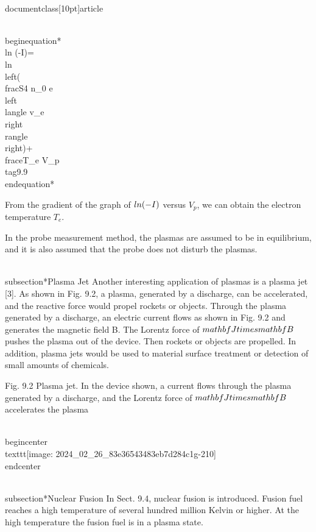 \\documentclass[10pt]{article}
\begin{document}
{{{{{\\begin{equation*}
\\ln (-I)=\\ln \\left(\\frac{S}{4} n_{0} e\\left\\langle v_{e}\\right\\rangle\\right)+\\frac{e}{T_{e}} V_{p} \\tag{9.9}
\\end{equation*}


From the gradient of the graph of $\\ln (-I)$ versus $V_{p}$, we can obtain the electron temperature $T_{e}$.

In the probe measurement method, the plasmas are assumed to be in equilibrium, and it is also assumed that the probe does not disturb the plasmas.

\\subsection*{Plasma Jet}
Another interesting application of plasmas is a plasma jet [3]. As shown in Fig. 9.2, a plasma, generated by a discharge, can be accelerated, and the reactive force would propel rockets or objects. Through the plasma generated by a discharge, an electric current flows as shown in Fig. 9.2 and generates the magnetic field B. The Lorentz force of $\\mathbf{J} \\times \\mathbf{B}$ pushes the plasma out of the device. Then rockets or objects are propelled. In addition, plasma jets would be used to material surface treatment or detection of small amounts of chemicals.

Fig. 9.2 Plasma jet. In the device shown, a current flows through the plasma generated by a discharge, and the Lorentz force of $\\mathbf{J} \\times \\mathbf{B}$ accelerates the plasma

\\begin{center}
\\texttt{[image: 2024\_02\_26\_83e36543483eb7d284c1g-210]}
\\end{center}

\\subsection*{Nuclear Fusion}
In Sect. 9.4, nuclear fusion is introduced. Fusion fuel reaches a high temperature of several hundred million Kelvin or higher. At the high temperature the fusion fuel is in a plasma state.

}}}}}
\end{document}

